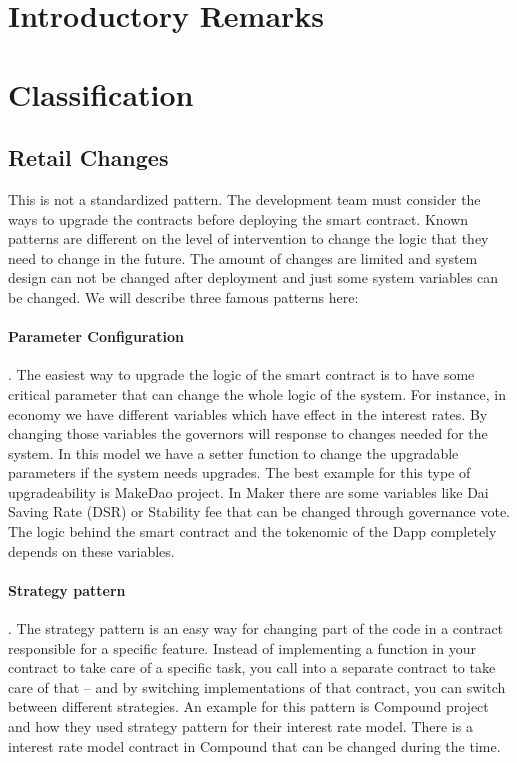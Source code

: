 

\section{Introductory Remarks}



\section{Classification}
\subsection{Retail Changes}
This is not a standardized pattern. The development team must consider the ways to upgrade the contracts before deploying the smart contract. Known patterns are different on the level of intervention to change the logic that they need to change in the future. The amount of changes are limited and system design can not be changed after deployment and just some system variables can be changed. We will describe three famous patterns here:

\paragraph{Parameter Configuration}. The easiest way to upgrade the logic of the smart contract is to have some critical parameter that can change the whole logic of the system. For instance, in economy we have different variables which have effect in the interest rates. By changing those variables the governors will response to changes needed for the system. 
In this model we have a setter function to change the upgradable parameters if the system needs upgrades. The best example for this type of upgradeability is MakeDao project. In Maker there are some variables like Dai Saving Rate (DSR) or Stability fee that can be changed through governance vote. The logic behind the smart contract and the tokenomic of the Dapp completely depends on these variables.

\paragraph{Strategy pattern}. The strategy pattern is an easy way for changing part of the code in a contract responsible for a specific feature. Instead of implementing a function in your contract to take care of a specific task, you call into a separate contract to take care of that – and by switching implementations of that contract, you can switch between different strategies.
An example for this pattern is Compound project and how they used strategy pattern for their interest rate model. There is a interest rate model contract in Compound that can be changed during the time. 

